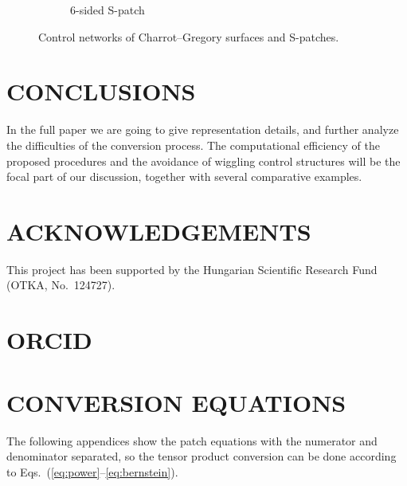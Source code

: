 \documentclass[9pt,academicons]{article}
\begin{document}
\begin{figure}
{\begin{subfigure}{.3\textwidth}
      \caption{6-sided S-patch}
      \label{fig:cagd86-6-sp}
    \end{subfigure}
    \hfill
  }
  \caption{Control networks of Charrot--Gregory surfaces and S-patches.}
  \label{fig:cagd86}
\end{figure}

\section{CONCLUSIONS}
In the full paper we are going to give representation details, and
further analyze the difficulties of the conversion process.
The computational efficiency of the proposed procedures
and the avoidance of wiggling control structures
will be the focal part of our discussion,
together with several comparative examples.

\section*{ACKNOWLEDGEMENTS}
This project has been supported by the Hungarian Scientific Research Fund (OTKA, No.~124727).

\section*{ORCID}

\appendix
\section{CONVERSION EQUATIONS}
\label{app:conversion-eqs}
The following appendices show the patch equations
with the numerator and denominator separated,
so the tensor product conversion can be done
according to Eqs.~(\ref{eq:power}--\ref{eq:bernstein}).
\end{document}
